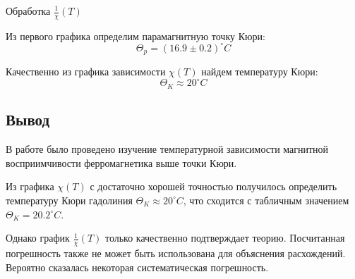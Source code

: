 \documentclass[12pt,a4paper]{article}
\begin{document}
\begin{table}[H]
	\footnotesize
	
	\caption{Обработка $\frac{1}{\chi}\left(T\right)$}
	\label{tab:mnk}
\end{table}

Из первого графика определим парамагнитную точку Кюри:
$$\Theta_p = ( 16.9 \pm 0.2 ) ^\circ C$$ 

Качественно из графика зависимости $\chi\left(T\right)$ найдем температуру Кюри:
$$\Theta_K \approx 20 ^\circ C$$

\subsection*{Вывод}

В работе было проведено изучение температурной зависимости магнитной восприимчивости ферромагнетика выше точки Кюри.

Из графика $\chi\left(T\right)$ с достаточно хорошей точностью получилось определить температуру Кюри гадолиния $\Theta_K \approx 20 ^\circ C$, что сходится с табличным значением $\Theta_K = 20.2 ^\circ C$.

Однако график $\frac{1}{\chi}\left(T\right)$ только качественно подтверждает теорию. Посчитанная погрешность также не может быть использована для объяснения расхождений. Вероятно сказалась некоторая систематическая погрешность.
\end{document}
